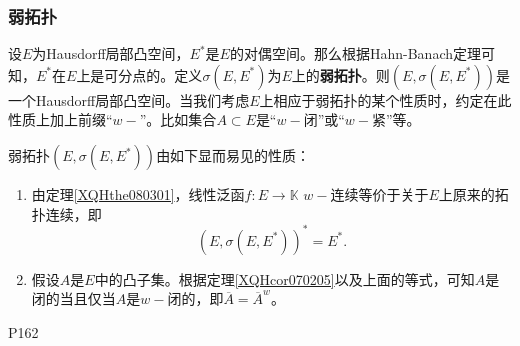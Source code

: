 \subsubsection{弱拓扑}

\original
{
	设$E$为Hausdorff局部凸空间，$E^{*}$是$E$的对偶空间。那么根据Hahn-Banach定理可知，$E^{*}$在$E$上是可分点的。定义$\sigma(E,E^{*})$为$E$上的\textbf{弱拓扑}。则$(E,\sigma(E,E^{*}))$是一个Hausdorff局部凸空间。当我们考虑$E$上相应于弱拓扑的某个性质时，约定在此性质上加上前缀“$w-$”。比如集合$A\subset E$是“$w-$闭”或“$w-$紧”等。
	\par
	弱拓扑$(E,\sigma(E,E^{*}))$由如下显而易见的性质：
	\begin{enumerate}
		\item 由定理\ref{XQHthe080301}，线性泛函$f:E\rightarrow\mathbb{K}$ $w-$连续等价于关于$E$上原来的拓扑连续，即
		\begin{equation*}
			(E,\sigma(E,E^{*}))^{*}=E^{*}.
		\end{equation*}
	
		\item 假设$A$是$E$中的凸子集。根据定理\ref{XQHcor070205}以及上面的等式，可知$A$是闭的当且仅当$A$是$w-$闭的，即$\overline{A}=\overline{A}^{w}$。
	\end{enumerate}
}
{P162}

